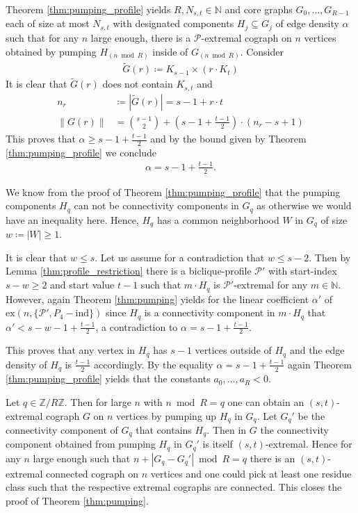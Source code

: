 \documentclass{article}
\newcommand{\NN}{\mathbb{N}}
\theoremstyle{definition}
\theoremstyle{definition}
\theoremstyle{definition}
\theoremstyle{definition}
\theoremstyle{definition}
\theoremstyle{definition}
\theoremstyle{definition}
\theoremstyle{definition}
\theoremstyle{definition}
\theoremstyle{definition}
\begin{document}
    Theorem \ref{thm:pumping_profile} yields $R, N_{s,t} \in \NN$ and core graphs $G_0, \ldots, G_{R-1}$ each of size at most $N_{s,t}$ with designated components $H_j \subseteq G_j$ of edge density $\alpha$ such that for any $n$ large enough, there is a $\mathscr{P}$-extremal cograph on $n$ vertices obtained by pumping $H_{(n \bmod R)}$ inside of $G_{(n \bmod R)}$.
    Consider
    \begin{align}
        \tilde{G}(r) \coloneq K_{s-1} \times (r \cdot K_{t})
    \end{align}
    It is clear that $\tilde{G}(r)$ does not contain $K_{s,t}$ and
    \begin{align}
        n_r &\coloneq | \tilde{G}(r) | = s-1 + r \cdot t \\
        \| G(r) \| &= \binom{s-1}{2} + \left( s-1 + \frac{t-1}{2} \right) \cdot (n_r - s + 1)
    \end{align}
    This proves that $\alpha \geq s-1 + \frac{t-1}{2}$ and by the bound given by Theorem \ref{thm:pumping_profile} we conclude
    \begin{align}
        \alpha = s-1 + \frac{t-1}{2}.
    \end{align}

    We know from the proof of Theorem \ref{thm:pumping_profile} that the pumping components $H_q$ can not be connectivity components in $G_q$ as otherwise we would have an inequality here.
    Hence, $H_q$ has a common neighborhood $W$ in $G_q$ of size $w \coloneq |W| \geq 1$.

    It is clear that $w \leq s$.
    Let us assume for a contradiction that $w \leq s-2$.
    Then by Lemma \ref{thm:profile_restriction} there is a biclique-profile $\mathscr{P}'$ with start-index $s - w \geq 2$ and start value $t-1$ such that $m \cdot H_q$ is $\mathscr{P}'$-extremal for any $m \in \NN$.
    However, again Theorem \ref{thm:pumping} yields for the linear coefficient $\alpha'$ of $\text{ex} \left( n, \{ \mathscr{P}', P_{4} - \text{ind} \} \right)$ since $H_q$ is a connectivity component in $m \cdot H_q$ that $\alpha' < s-w-1 + \frac{t-1}{2}$, a contradiction to $\alpha = s-1 + \frac{t-1}{2}$.

    This proves that any vertex in $H_q$ has $s-1$ vertices outside of $H_q$ and the edge density of $H_q$ is $\frac{t-1}{2}$ accordingly.
    By the equality $\alpha = s-1 + \frac{t-1}{2}$ again Theorem \ref{thm:pumping_profile} yields that the constants $a_0, \dots, a_R < 0$.

    Let $q \in \mathbb{Z}/R\mathbb{Z}$. Then for large $n$ with $n \bmod R = q$ one can obtain an $(s,t)$-extremal cograph $G$ on $n$ vertices by pumping up $H_q$ in $G_q$.
    Let $G_q'$ be the connectivity component of $G_q$ that contains $H_q$. Then in $G$ the connectivity component obtained from pumping $H_q$ in $G_q'$ is itself $(s,t)$-extremal.
    Hence for any $n$ large enough such that $n + |G_q - G_q'| \bmod R = q$ there is an $(s,t)$-extremal connected cograph on $n$ vertices and one could pick at least one residue class such that the respective extremal cographs are connected.
    This closes the proof of Theorem \ref{thm:pumping}.
\end{document}
